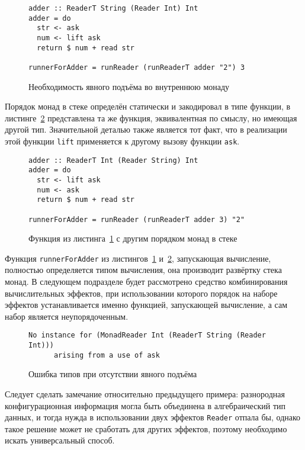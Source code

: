 \begin{figure}[t]
\begin{lstlisting}
adder :: ReaderT String (Reader Int) Int
adder = do
  str <- ask
  num <- lift ask
  return $ num + read str

runnerForAdder = runReader (runReaderT adder "2") 3
\end{lstlisting}
\caption{Необходимость явного подъёма во внутреннюю монаду}
\label{listing:mtlReadersLift}
\end{figure}

Порядок монад в стеке определён статически и закодировал в типе функции, 
в листинге~\ref{listing:mtlDifferentReadersLift} представлена та же функция, 
эквивалентная по смыслу, но имеющая другой тип. Значительной деталью также 
является тот факт, что в реализации этой функции \lstinline{lift} применяется 
к другому вызову функции \lstinline{ask}.

\begin{figure}[t]
\begin{lstlisting}
adder :: ReaderT Int (Reader String) Int
adder = do
  str <- lift ask
  num <- ask
  return $ num + read str

runnerForAdder = runReader (runReaderT adder 3) "2"
\end{lstlisting}
\caption{Функция из листинга~\ref{listing:mtlReadersLift} с другим порядком монад в стеке}
\label{listing:mtlDifferentReadersLift}
\end{figure}

Функция \lstinline{runnerForAdder} из листингов~\ref{listing:mtlReadersLift} 
и~\ref{listing:mtlDifferentReadersLift}, запускающая вычисление, полностью 
определяется типом вычисления, она производит развёртку стека монад. 
В следующем подразделе будет рассмотрено средство комбинирования вычислительных 
эффектов, при использовании которого порядок на наборе эффектов устанавливается 
именно функцией, запускающей вычисление, а сам набор является неупорядоченным.

\begin{figure}[t]
\begin{lstlisting}
No instance for (MonadReader Int (ReaderT String (Reader Int)))
      arising from a use of ask
\end{lstlisting}
\caption{Ошибка типов при отсутствии явного подъёма}
\label{listing:mtlCompileError}
\end{figure}

Следует сделать замечание относительно предыдущего примера: разнородная 
конфигурационная информация могла быть объединена в алгебраический тип данных, 
и тогда нужда в использовании двух эффектов \lstinline{Reader} отпала бы, 
однако такое решение может не сработать для других эффектов, поэтому необходимо 
искать универсальный способ.

